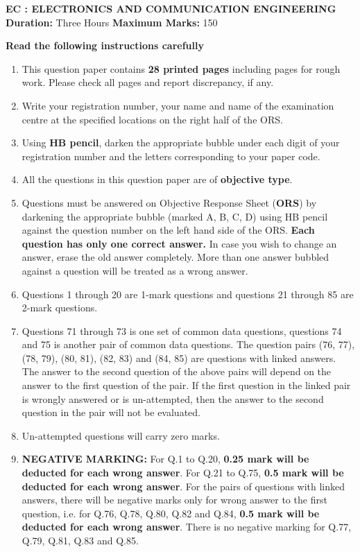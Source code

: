 \documentclass[12pt,a4paper]{article}
\begin{document}
\begin{center}
    {\LARGE \textbf{EC : ELECTRONICS AND COMMUNICATION ENGINEERING}}\\[0.7em]
    \textbf{Duration:} Three Hours
    \hspace{2cm}
    \textbf{Maximum Marks:} 150
\end{center}

\vspace{1.5em}
\textbf{Read the following instructions carefully}
\begin{enumerate}[leftmargin=2em,itemsep=0.5em]
    \item This question paper contains \textbf{28 printed pages} including pages for rough work. Please check all pages and report discrepancy, if any.
    \item Write your registration number, your name and name of the examination centre at the specified locations on the right half of the ORS.
    \item Using \textbf{HB pencil}, darken the appropriate bubble under each digit of your registration number and the letters corresponding to your paper code.
    \item All the questions in this question paper are of \textbf{objective type}.
    \item Questions must be answered on Objective Response Sheet (\textbf{ORS}) by darkening the appropriate bubble (marked A, B, C, D) using HB pencil against the question number on the left hand side of the ORS. \textbf{Each question has only one correct answer.} In case you wish to change an answer, erase the old answer completely. More than one answer bubbled against a question will be treated as a wrong answer.
    \item Questions 1 through 20 are 1-mark questions and questions 21 through 85 are 2-mark questions.
    \item Questions 71 through 73 is one set of common data questions, questions 74 and 75 is another pair of common data questions. The question pairs (76, 77), (78, 79), (80, 81), (82, 83) and (84, 85) are questions with linked answers. The answer to the second question of the above pairs will depend on the answer to the first question of the pair. If the first question in the linked pair is wrongly answered or is un-attempted, then the answer to the second question in the pair will not be evaluated.
    \item Un-attempted questions will carry zero marks.
    \item \textbf{NEGATIVE MARKING:} For Q.1 to Q.20, \textbf{0.25 mark will be deducted for each wrong answer}. For Q.21 to Q.75, \textbf{0.5 mark will be deducted for each wrong answer}. For the pairs of questions with linked answers, there will be negative marks only for wrong answer to the first question, i.e. for Q.76, Q.78, Q.80, Q.82 and Q.84, \textbf{0.5 mark will be deducted for each wrong answer}. There is no negative marking for Q.77, Q.79, Q.81, Q.83 and Q.85.

\end{enumerate}
\end{document}
